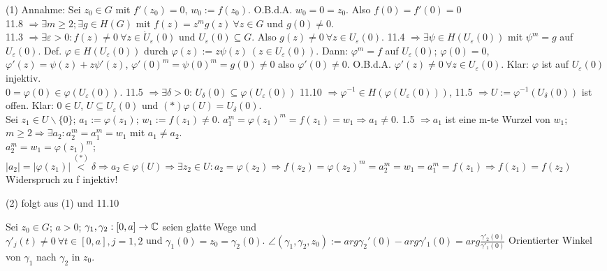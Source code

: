 \documentclass[a4paper,twoside,DIV15,BCOR12mm]{scrbook}
\begin{document}
\begin{beweis}
	\begin{liste}
		\item[ (1) ] Annahme: Sei $z_0 \in G$ mit $f'(z_0) = 0$, $w_0 := f(z_0)$. O.B.d.A. $w_0 = 0 = z_0$. Also $f(0) = f'(0) = 0$\\
			11.8 $\Rightarrow \exists m \geq 2; \exists g \in H(G)$ mit $f(z) = z^mg(z)\ \forall z \in G$ und $g(0) \neq 0$.\\
			11.3 $\Rightarrow \exists \varepsilon > 0: f(z) \neq 0\ \forall z \in \dot{U}_{\varepsilon}(0)$ und 
			$U_{\varepsilon}(0) \subseteq G$. Also $g(z) \neq 0\ \forall z \in U_{\varepsilon}(0)$. 11.4 $\Rightarrow 
			\exists \psi \in H(U_{\varepsilon}(0))$ mit $\psi^m = g$ auf $U_{\varepsilon}(0)$. Def. $\varphi \in H(U_{\varepsilon}(0))$
			durch $\varphi(z) := z\psi (z)\ (z \in U_{\varepsilon}(0))$. Dann: $\varphi^m = f$ auf $U_{\varepsilon}(0)$; $\varphi(0) = 0$, 
			$\varphi'(z) = \psi(z) + z\psi'(z)$, $\varphi'(0)^m = \psi(0)^m = g(0) \neq 0$ also $\varphi'(0) \neq 0$. 
			O.B.d.A. $\varphi'(z) \neq 0\ \forall z \in U_{\varepsilon}(0)$. Klar: $\varphi$ ist auf $U_{\varepsilon}(0)$ injektiv. \\
			$0 = \varphi(0) \in \varphi(U_{\varepsilon}(0))$. 11.5 $\Rightarrow \exists \delta > 0$: $U_{\delta}(0) \subseteq  \varphi(U_{\varepsilon}(0))$
			11.10 $\Rightarrow \varphi^{-1} \in H( \varphi(U_{\varepsilon}(0)))$, 11.5 $\Rightarrow U:=  \varphi^{-1}(U_{\delta}(0))$ ist offen.
			Klar: $0 \in U$, $U \subseteq U_{\varepsilon}(0)$ und $(*) \varphi(U) = U_{\delta}(0).$\\
			Sei $z_1 \in U\backslash\{0\}$; $a_1 := \varphi(z_1)$; $w_1 := f(z_1) \neq 0$.
			$a_1^m = \varphi(z_1)^m = f(z_1) = w_1 \Rightarrow a_1 \neq 0$.
			1.5 $\Rightarrow a_1$ ist eine m-te Wurzel von $w_1$; $m \geq 2 \Rightarrow \exists a_2: a_2^m = a_1^m = w_1$ mit $a_1 \neq a_2$. \\
			$a_2^m = w_1 = \varphi(z_1)^m$; $|a_2| = |\varphi(z_1)| \stackrel{(*)}{<} \delta \Rightarrow a_2 \in \varphi(U)
			\Rightarrow \exists z_2 \in U: a_2 =\varphi(z_2) \Rightarrow f(z_2) = \varphi(z_2)^m = a_2^m = w_1 = a_1^m = f(z_1) \Rightarrow f(z_1) = f(z_2)$
			Widerspruch zu f injektiv!
		\item[ (2) ] folgt aus (1) und 11.10
 	\end{liste}
\end{beweis}

\begin{definition}
	Sei $z_0 \in G$; $a > 0$; $\gamma_1, \gamma_2: [0,a]\rightarrow \mathbb{C}$ seien glatte Wege und \\
	$\gamma'_j(t) \neq 0\ \forall t \in [0,a], j = 1,2$ und $\gamma_1(0) = z_0 = \gamma_2(0)$.
	$\angle(\gamma_1, \gamma_2, z_0) := arg \gamma_2'(0) - arg \gamma'_1(0) = arg \frac{\gamma'_2(0)}{\gamma'_1(0)}$ 
	Orientierter Winkel von $\gamma_1$ nach $\gamma_2$ in $z_0$. 
\end{definition}
\end{document}
